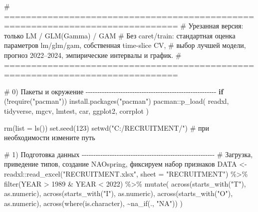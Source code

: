 \documentclass[
  letterpaper,
  DIV=11,
  numbers=noendperiod]{scrreprt}
\newenvironment{Shaded}{\begin{snugshade}}{\end{snugshade}}
\newcommand{\AttributeTok}[1]{\textcolor[rgb]{0.40,0.45,0.13}{#1}}
\newcommand{\CommentTok}[1]{\textcolor[rgb]{0.37,0.37,0.37}{#1}}
\newcommand{\ControlFlowTok}[1]{\textcolor[rgb]{0.00,0.23,0.31}{\textbf{#1}}}
\newcommand{\DecValTok}[1]{\textcolor[rgb]{0.68,0.00,0.00}{#1}}
\newcommand{\FunctionTok}[1]{\textcolor[rgb]{0.28,0.35,0.67}{#1}}
\newcommand{\NormalTok}[1]{\textcolor[rgb]{0.00,0.23,0.31}{#1}}
\newcommand{\OtherTok}[1]{\textcolor[rgb]{0.00,0.23,0.31}{#1}}
\newcommand{\SpecialCharTok}[1]{\textcolor[rgb]{0.37,0.37,0.37}{#1}}
\newcommand{\StringTok}[1]{\textcolor[rgb]{0.13,0.47,0.30}{#1}}
\begin{document}
\begin{Shaded}
\begin{Highlighting}[]
\CommentTok{\# ==============================================================================}
\CommentTok{\# Урезанная версия: только LM / GLM(Gamma) / GAM}
\CommentTok{\# Без caret/train: стандартная оценка параметров lm/glm/gam, собственная time{-}slice CV,}
\CommentTok{\# выбор лучшей модели, прогноз 2022–2024, эмпирические интервалы и график.}
\CommentTok{\# ==============================================================================}

\CommentTok{\# 0) Пакеты и окружение {-}{-}{-}{-}{-}{-}{-}{-}{-}{-}{-}{-}{-}{-}{-}{-}{-}{-}{-}{-}{-}{-}{-}{-}{-}{-}{-}{-}{-}{-}{-}{-}{-}{-}{-}{-}{-}{-}{-}{-}{-}{-}{-}{-}{-}{-}{-}{-}{-}{-}{-}{-}{-}{-}{-}{-}}
\ControlFlowTok{if}\NormalTok{ (}\SpecialCharTok{!}\FunctionTok{require}\NormalTok{(}\StringTok{"pacman"}\NormalTok{)) }\FunctionTok{install.packages}\NormalTok{(}\StringTok{"pacman"}\NormalTok{)}
\NormalTok{pacman}\SpecialCharTok{::}\FunctionTok{p\_load}\NormalTok{(}
\NormalTok{  readxl, tidyverse, mgcv, lmtest, car, ggplot2, corrplot}
\NormalTok{)}

\FunctionTok{rm}\NormalTok{(}\AttributeTok{list =} \FunctionTok{ls}\NormalTok{())}
\FunctionTok{set.seed}\NormalTok{(}\DecValTok{123}\NormalTok{)}
\FunctionTok{setwd}\NormalTok{(}\StringTok{"C:/RECRUITMENT/"}\NormalTok{)  }\CommentTok{\# при необходимости измените путь}


\CommentTok{\# 1) Подготовка данных {-}{-}{-}{-}{-}{-}{-}{-}{-}{-}{-}{-}{-}{-}{-}{-}{-}{-}{-}{-}{-}{-}{-}{-}{-}{-}{-}{-}{-}{-}{-}{-}{-}{-}{-}{-}{-}{-}{-}{-}{-}{-}{-}{-}{-}{-}{-}{-}{-}{-}{-}{-}{-}{-}{-}{-}{-}}
\CommentTok{\# Загрузка, приведение типов, создание NAOspring, фиксируем набор признаков}
\NormalTok{DATA }\OtherTok{\textless{}{-}}\NormalTok{ readxl}\SpecialCharTok{::}\FunctionTok{read\_excel}\NormalTok{(}\StringTok{"RECRUITMENT.xlsx"}\NormalTok{, }\AttributeTok{sheet =} \StringTok{"RECRUITMENT"}\NormalTok{) }\SpecialCharTok{\%\textgreater{}\%}
  \FunctionTok{filter}\NormalTok{(YEAR }\SpecialCharTok{\textgreater{}} \DecValTok{1989} \SpecialCharTok{\&}\NormalTok{ YEAR }\SpecialCharTok{\textless{}} \DecValTok{2022}\NormalTok{) }\SpecialCharTok{\%\textgreater{}\%}
  \FunctionTok{mutate}\NormalTok{(}
    \FunctionTok{across}\NormalTok{(}\FunctionTok{starts\_with}\NormalTok{(}\StringTok{"T"}\NormalTok{), as.numeric),}
    \FunctionTok{across}\NormalTok{(}\FunctionTok{starts\_with}\NormalTok{(}\StringTok{"I"}\NormalTok{), as.numeric),}
    \FunctionTok{across}\NormalTok{(}\FunctionTok{starts\_with}\NormalTok{(}\StringTok{"O"}\NormalTok{), as.numeric),}
    \FunctionTok{across}\NormalTok{(}\FunctionTok{where}\NormalTok{(is.character), }\SpecialCharTok{\textasciitilde{}}\FunctionTok{na\_if}\NormalTok{(., }\StringTok{"NA"}\NormalTok{))}
\NormalTok{  )}


\end{Highlighting}
\end{Shaded}
\end{document}
